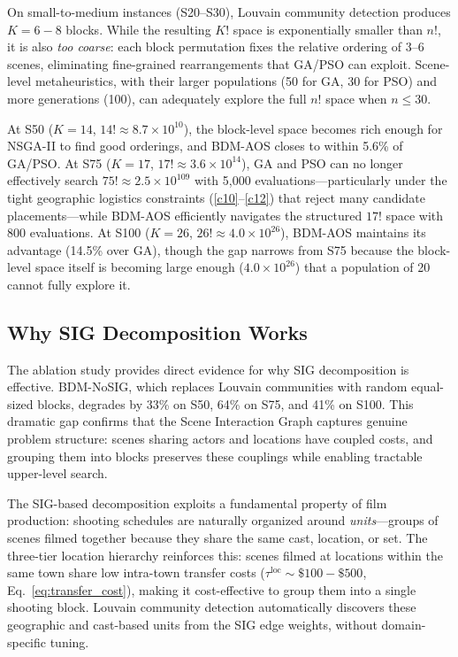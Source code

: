 On small-to-medium instances (S20--S30), Louvain community detection produces $K{=}6{-}8$ blocks.
While the resulting $K!$ space is exponentially smaller than $n!$, it is also \emph{too coarse}: each block permutation fixes the relative ordering of 3--6 scenes, eliminating fine-grained rearrangements that GA/PSO can exploit.
Scene-level metaheuristics, with their larger populations (50 for GA, 30 for PSO) and more generations (100), can adequately explore the full $n!$ space when $n \leq 30$.

At S50 ($K{=}14$, $14! \approx 8.7 \times 10^{10}$), the block-level space becomes rich enough for NSGA-II to find good orderings, and BDM-AOS closes to within 5.6\% of GA/PSO.
At S75 ($K{=}17$, $17! \approx 3.6 \times 10^{14}$), GA and PSO can no longer effectively search $75! \approx 2.5 \times 10^{109}$ with 5{,}000 evaluations---particularly under the tight geographic logistics constraints (\ref{c10}--\ref{c12}) that reject many candidate placements---while BDM-AOS efficiently navigates the structured $17!$ space with 800 evaluations.
At S100 ($K{=}26$, $26! \approx 4.0 \times 10^{26}$), BDM-AOS maintains its advantage (14.5\% over GA), though the gap narrows from S75 because the block-level space itself is becoming large enough ($4.0 \times 10^{26}$) that a population of 20 cannot fully explore it.

\subsection{Why SIG Decomposition Works}

The ablation study provides direct evidence for why SIG decomposition is effective.
BDM-NoSIG, which replaces Louvain communities with random equal-sized blocks, degrades by 33\% on S50, 64\% on S75, and 41\% on S100.
This dramatic gap confirms that the Scene Interaction Graph captures genuine problem structure: scenes sharing actors and locations have coupled costs, and grouping them into blocks preserves these couplings while enabling tractable upper-level search.

The SIG-based decomposition exploits a fundamental property of film production: shooting schedules are naturally organized around \emph{units}---groups of scenes filmed together because they share the same cast, location, or set.
The three-tier location hierarchy reinforces this: scenes filmed at locations within the same town share low intra-town transfer costs ($\tau^{\text{loc}} \sim \$100{-}\$500$, Eq.~\eqref{eq:transfer_cost}), making it cost-effective to group them into a single shooting block.
Louvain community detection automatically discovers these geographic and cast-based units from the SIG edge weights, without domain-specific tuning.

